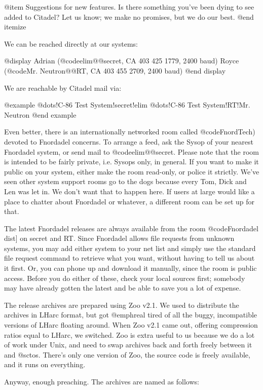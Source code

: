 @item
Suggestions for new features.  Is there something you've been
dying to see added to Citadel?  Let us know; we make no
promises, but we do our best.
@end itemize

We can be reached directly at our systems:

@display
Adrian (@code{elim@@secret}, CA 403 425 1779, 2400 baud)
Royce (@code{Mr. Neutron@@RT}, CA 403 455 2709, 2400 baud)
@end display

We are reachable by Citadel mail via:

@example
@dots{}!C-86 Test System!secret!elim
@dots{}!C-86 Test System!RT!Mr. Neutron
@end example

Even better, there is an internationally networked room called
@code{FnordTech)} devoted to
Fnordadel concerns.  To arrange a feed, ask the Sysop of your nearest
Fnordadel system, or send mail to @code{elim@@secret}.  Please note that
the room is intended to be fairly private, i.e. Sysops only, in general.  If
you want to make it public on your system, either make the room read-only,
or police
it strictly.  We've seen other system support rooms go to the dogs because
every Tom, Dick and Len was let in.  We don't want that to happen here.  If
users at large would like a place to chatter about Fnordadel or whatever,
a different room can be set up for that.

The latest Fnordadel releases are always available from the room
@code{Fnordadel dist]} on secret and RT.  Since Fnordadel allows file requests
from unknown systems, you may add either system to your net list and simply
use the
standard file request command to retrieve what you want, without having
to tell us about it first.  Or, you can phone up and download it manually,
since the room is public access.  Before you do either of these, check your
local sources first; somebody may have already gotten the latest and be able
to save you a lot of expense.

The release archives are prepared using Zoo v2.1.  We used to distribute
the archives in LHarc format, but got @emph{real} tired of all the buggy,
incompatible versions of LHarc floating around.  When Zoo v2.1 came out,
offering compression ratios equal to LHarc, we switched.  Zoo is extra
useful to us because we do a lot of work under Unix, and need to swap
archives back and forth freely between it and @sc{tos}.  There's only one
version of Zoo, the source code is freely available, and it runs on everything.

Anyway, enough preaching.  The archives are named as follows:

